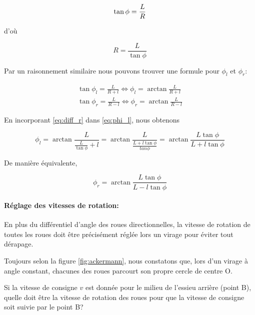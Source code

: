 \documentclass[12pt,a4paper]{report}
\begin{document}
			\begin{equation}
			\tan{\phi} = \frac{L}{R} \\
			\end{equation}
			
			d'où
			
			\begin{equation}
			\label{eq:diff_r}
			R = \frac{L}{\tan{\phi}}
			\end{equation}
			
			\para Par un raisonnement similaire nous pouvons trouver une formule pour $\phi_l$ et $\phi_r$:
			
			\begin{gather}
			\label{eq:phi_l}
			\tan{\phi_l} = \frac{L}{R+l} \Longleftrightarrow \phi_l = \arctan{\frac{L}{R+l}} \\[2ex]
			\tan{\phi_r} = \frac{L}{R-l} \Longleftrightarrow \phi_r = \arctan{\frac{L}{R-l}}
			\end{gather}
			
			En incorporant \ref{eq:diff_r} dans \ref{eq:phi_l}, nous obtenons
			
			\begin{equation}
			\phi_l = \arctan{\frac{L}{\frac{L}{\tan{\phi}} + l}} = \arctan{\frac{L}{\frac{L + l\tan{\phi}}{tan{\phi}}}} = \arctan{\frac{L \tan{\phi}}{L+l \tan{\phi}}}
			\end{equation}
			
			\para De manière équivalente, 
			
			\begin{equation}
			\phi_r = \arctan{\frac{L\tan{\phi}}{L - l \tan{\phi}}}
			\end{equation}
			
			\paragraph*{Réglage des vitesses de rotation:} En plus du différentiel d'angle des roues directionnelles, la vitesse de rotation de toutes les roues doit être précisément réglée lors un virage pour éviter tout dérapage.
			
			\para Toujours selon la figure \ref{fig:ackermann}, nous constatons que, lors d'un virage à angle constant, chacunes des roues parcourt son propre cercle de centre O. 
			
			\para Si la vitesse de consigne $v$ est donnée pour le milieu de l'essieu arrière (point B), quelle doit être la vitesse de rotation des roues pour que la vitesse de consigne soit suivie par le point B?
			
\end{document}
